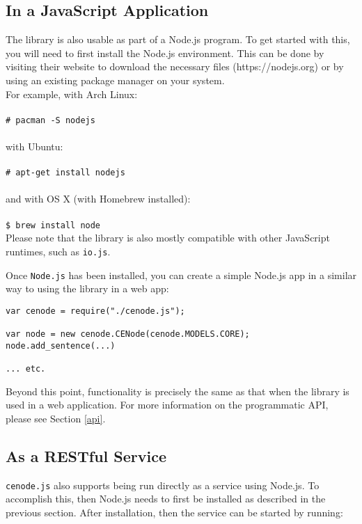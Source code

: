 \documentclass{scrartcl}
\newcommand{\js}[1]{\texttt{#1}}
\begin{document}
\subsection{In a JavaScript Application}
\label{as_an_app}
The library is also usable as part of a Node.js program. To get started with this, you will need to first install the Node.js environment. This can be done by visiting their website to download the necessary files (https://nodejs.org) or by using an existing package manager on your system.\\
For example, with Arch Linux:\\
\\\js{\# pacman -S nodejs}\\
\\with Ubuntu:\\
\\\js{\# apt-get install nodejs}\\
\\and with OS X (with Homebrew installed):\\
\\\js{\$ brew install node}\\

Please note that the library is also mostly compatible with other JavaScript runtimes, such as \js{io.js}.

Once \js{Node.js} has been installed, you can create a simple Node.js app in a similar way to using the library in a web app:

\begin{verbatim}
var cenode = require("./cenode.js");

var node = new cenode.CENode(cenode.MODELS.CORE);
node.add_sentence(...)

... etc.
\end{verbatim}

Beyond this point, functionality is precisely the same as that when the library is used in a web application. For more information on the programmatic API, please see Section \ref{api}.


\subsection{As a RESTful Service}
\label{as_a_service}

\js{cenode.js} also supports being run directly as a service using Node.js. To accomplish this, then Node.js needs to first be installed as described in the previous section. After installation, then the service can be started by running:
\end{document}
